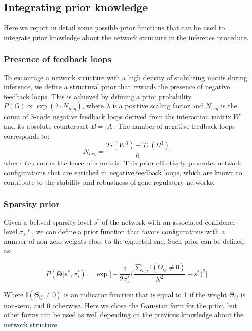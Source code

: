 \documentclass[10pt, aps, rmp,  twocolumn, superscriptaddress, floatfix, showkeys]{revtex4-2}
\begin{document}
\subsection{Integrating prior knowledge}

Here we report in detail some possible prior functions that can be used to integrate prior knowledge about the network structure in the inference procedure.

\subsubsection{Presence of feedback loops}

To encourage a network structure with a high density of stabilizing motifs during inference, we define a structural prior that rewards the presence of negative feedback loops. This is achieved by defining a prior probability $P(G) \propto \exp(\lambda \cdot N_{neg})$, where $\lambda$ is a positive scaling factor and $N_{neg}$ is the count of 3-node negative feedback loops derived from the interaction matrix $W$ and its absolute counterpart $B = |A|$. The number of negative feedback loops corresponds to:
\[
N_{neg} = \frac{Tr(W^3)-Tr(B^3)}{6}
\]
where $Tr$ denotes the trace of a matrix. This prior effectively promotes network configurations that are enriched in negative feedback loops, which are known to contribute to the stability and robustness of gene regulatory networks.

\subsubsection{Sparsity prior}

Given a belived sparsity level $s^\ast$ of the network with an associated confidence level $\sigma_s\ast$, we can define a prior function that favors configurations with a number of non-zero weights close to the expected one. Such prior can be defined as:

\begin{equation}
    P(\mathbf{\Theta}|s^\ast,\sigma_s^\ast) = \exp\Big[-\frac{1}{2\sigma_s^\ast}\Big(\frac{\sum_{i,j}\mathbb{I}(\Theta_{ij}\neq 0)}{N^2}-s^\ast\Big)^2\Big]
\end{equation}

Where $\mathbb{I}(\Theta_{ij}\neq 0)$ is an indicator function that is equal to 1 if the weight $\Theta_{ij}$ is non-zero, and 0 otherwise. Here we chose the Gaussian form for the prior, but other forms can be used as well depending on the previous knowledge about the network structure.
\end{document}
